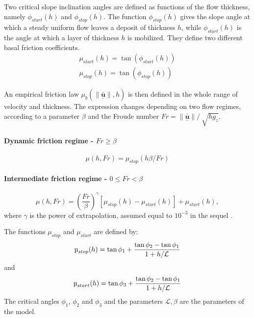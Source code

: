 \documentclass[nhess, manuscript]{copernicus}
\begin{document}
Two critical slope inclination angles are defined as functions of the flow thickness, namely $\phi_{start}(h)$ and $\phi_{stop}(h)$. The function $\phi_{stop}(h)$ gives the slope angle at which a steady uniform flow leaves a deposit of thickness $h$, while $\phi_{start}(h)$ is the angle at which a layer of thickness $h$ is mobilized. They define two different basal friction coefficients.
\begin{eqnarray}
\mu_{start}(h)=\tan(\phi_{start}(h))\\
\mu_{stop}(h)=\tan(\phi_{stop}(h))
\end{eqnarray}

An empirical friction law $\mu_{b}(\|\underset{^\sim}{\bar{\textbf{u}}} \| , h)$ is then defined in the whole range of velocity and thickness. The expression changes depending on two flow regimes, according to a parameter $\beta$ and the Froude number $Fr=\| \underset{^\sim}{\bar{\textbf{u}}} \| / \ \sqrt{h g_{z}}$.

\paragraph{Dynamic friction regime - $Fr \ge \beta$}
\begin{equation}\label{mu_beta1}
\mu(h, Fr)=\mu_{stop}(h \beta / Fr)
\end{equation}

\paragraph{Intermediate friction regime - $0 \le Fr < \beta$}
\begin{equation}\label{mu_beta2}
\mu(h, Fr)=\left(\frac{Fr}{\beta}\right)^\gamma [\mu_{stop}(h)-\mu_{start}(h)] + \mu_{start}(h),
\end{equation}
where $\gamma$ is the power of extrapolation, assumed equal to $10^{-3}$ in the sequel \citep{PouliquenForterre2002}.

The functions $\mu_{stop}$ and $\mu_{start}$ are defined by:
\begin{equation}\label{mu-stop}
\mu_{stop}(h)=\tan\phi_{1} + \frac{\tan\phi_{2}-\tan\phi_{1}}{1+h/\it \mathcal{L}}
\end{equation}
and
\begin{equation}\label{mu-start}
\mu_{start}(h)=\tan\phi_{3} + \frac{\tan\phi_{2}-\tan\phi_{1}}{1+h/\it \mathcal{L}}
\end{equation}
The critical angles $\phi_{1}$, $\phi_{2}$ and $\phi_{3}$ and the parameters $\mathcal{L}, \beta$ are the parameters of the model.
\end{document}
